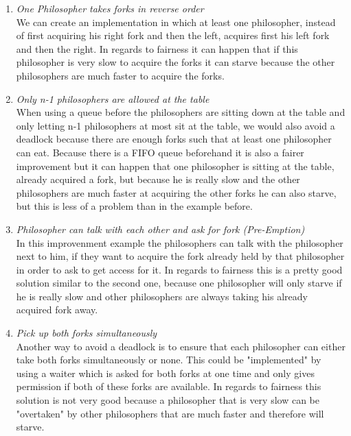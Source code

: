 \documentclass{report}
\begin{document}
		\begin{enumerate}
			\item \textit{One Philosopher takes forks in reverse order} \\
			We can create an implementation in which at least one philosopher, instead of first acquiring his right fork and then the left, acquires first his left fork and then the right. In regards to fairness it can happen that if this philosopher is very slow to acquire the forks it can starve because the other philosophers are much faster to acquire the forks.
			\item \textit{Only n-1 philosophers are allowed at the table} \\
			When using a queue before the philosophers are sitting down at the table and only letting n-1 philosophers at most sit at the table, we would also avoid a deadlock because there are enough forks such that at least one philosopher can eat. Because there is a FIFO queue beforehand it is also a fairer improvement but it can happen that one philosopher is sitting at the table, already acquired a fork, but because he is really slow and the other philosophers are much faster at acquiring the other forks he can also starve, but this is less of a problem than in the example before.
			\item \textit{Philosopher can talk with each other and ask for fork (Pre-Emption)} \\
			In this improvenment example the philosophers can talk with the philosopher next to him, if they want to acquire the fork already held by that philosopher in order to ask to get access for it. In regards to fairness this is a pretty good solution similar to the second one, because one philosopher will only starve if he is really slow and other philosophers are always taking his already acquired fork away.
			\item \textit{Pick up both forks simultaneously} \\
			Another way to avoid a deadlock is to ensure that each philosopher can either take both forks simultaneously or none. This could be "implemented" by using a waiter which is asked for both forks at one time and only gives permission if both of these forks are available. In regards to fairness this solution is not very good because a philosopher that is very slow can be "overtaken" by other philosophers that are much faster and therefore will starve.
		\end{enumerate}
	\closesection
	
	\newpage
	
\end{document}
